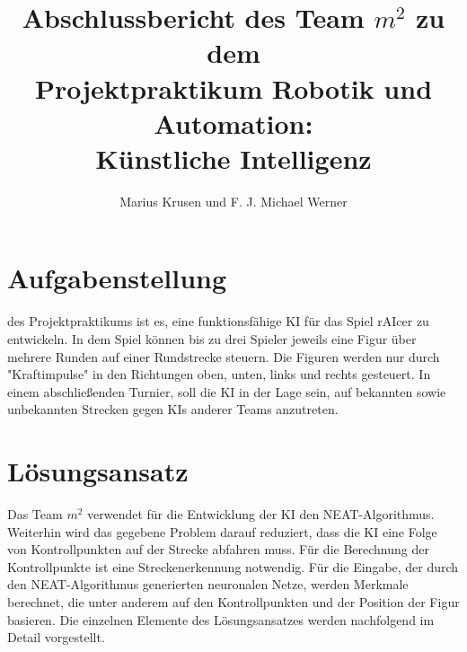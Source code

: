\documentclass[11pt,final,journal,a4paper,towside,towcolumn]{IEEEtran}
\begin{document}
\begin{acronym}
\end{acronym}
	
\title{Abschlussbericht des Team $m^2$ zu dem \\Projektpraktikum Robotik und Automation:\\Künstliche Intelligenz}
\author{Marius Krusen und F. J. Michael Werner}
\maketitle

\section{Aufgabenstellung}
 des Projektpraktikums ist es, eine funktionsfähige  \ac{KI} für das Spiel rAIcer zu entwickeln. In dem Spiel können bis zu drei Spieler jeweils eine Figur über mehrere Runden auf einer Rundstrecke steuern. Die Figuren werden nur durch "Kraftimpulse" in den Richtungen oben, unten, links und rechts gesteuert. In einem abschließenden Turnier, soll die \ac{KI} in der Lage sein, auf bekannten sowie unbekannten Strecken gegen \acp{KI} anderer Teams anzutreten.

\section{Lösungsansatz}
Das Team $m^2$ verwendet für die Entwicklung der \ac{KI} den \ac{NEAT}-Algorithmus. Weiterhin wird das gegebene Problem darauf reduziert, dass die \ac{KI} eine Folge von Kontrollpunkten auf der Strecke abfahren muss. Für die Berechnung der Kontrollpunkte ist eine Streckenerkennung notwendig. Für die Eingabe, der durch den \ac{NEAT}-Algorithmus generierten neuronalen Netze, werden Merkmale berechnet, die unter anderem auf den Kontrollpunkten und der Position der Figur basieren. Die einzelnen Elemente des Lösungsansatzes werden nachfolgend im Detail vorgestellt.
\end{document}
